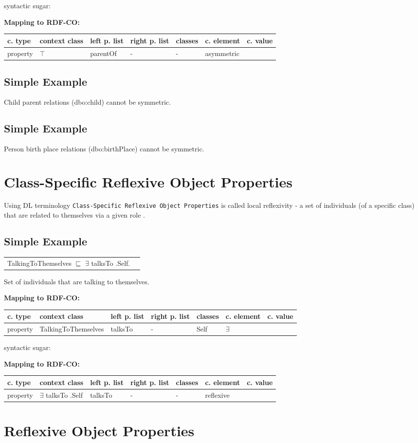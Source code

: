 \documentclass{llncs}
\newcommand{\ms}[1]{\texttt{#1}}
\newenvironment{gcotable}{
  \scriptsize
  \sffamily
  \vspace{0cm}
	\begin{center}
	\textbf{\vspace{0.4cm}Mapping to RDF-CO:} \\
  \begin{tabular}{l|l|l|l|l|l|l}
	\hline
  \textbf{c. type} & \textbf{context class} & \textbf{left p. list} & \textbf{right p. list} & \textbf{classes} & \textbf{c. element} & \textbf{c. value} \\
  \hline

}{
  \hline
  \end{tabular}
	\end{center}
}
\newenvironment{DL}{
  \vspace{0cm}
	\begin{center}
  \begin{tabular}{r l}

}{
  \end{tabular}
	\end{center}
}
\begin{document}
syntactic sugar:

\begin{gcotable}
property & $\top$ & parentOf & - & - & asymmetric \\
\end{gcotable}

\subsection{Simple Example}

Child parent relations (dbo:child) cannot be symmetric.

\subsection{Simple Example}

Person birth place relations (dbo:birthPlace) cannot be symmetric.

\section{Class-Specific Reflexive Object Properties}

Using DL terminology \ms{Class-Specific Reflexive Object Properties} is called local reflexivity - a set of individuals (of a specific class) that are related to themselves via a given role \cite{Kroetzsch2012}.

\subsection{Simple Example}

\begin{DL}
TalkingToThemselves $\sqsubseteq$ $\exists$ talksTo .Self. 
\end{DL}

Set of individuals that are talking to themselves.

\begin{gcotable}
property & TalkingToThemselves & talksTo & - & Self & $\exists$ \\
\end{gcotable}

syntactic sugar:

\begin{gcotable}
property & $\exists$ talksTo .Self & talksTo & - & - & reflexive \\
\end{gcotable}


\section{Reflexive Object Properties}
\end{document}
